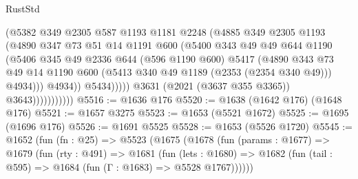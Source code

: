 \begin{lexlean}{RustStd}
\begin{coremodule}
{\begin{coremodule}
{{{{{{{{{{{{{{{{                                  (@5382
                                    @349
                                    @2305
                                    @587
                                    @1193
                                    @1181
                                    @2248
                                    (@4885
                                      @349
                                      @2305
                                      @1193
                                      (@4890
                                        @347
                                        @73
                                        @51
                                        @14
                                        @1191
                                        @600
                                        (@5400
                                          @343
                                          @49
                                          @49
                                          @644
                                          @1190
                                          (@5406
                                            @345
                                            @49
                                            @2336
                                            @644
                                            (@596 @1190 @600)
                                            @5417
                                            (@4890
                                              @343
                                              @73
                                              @49
                                              @14
                                              @1190
                                              @600
                                              (@5413 @340 @49 @1189 (@2353 (@2354 @340 @49)))
                                              @4934)))
                                        @4934))
                                    @5434)))))
                          @3631
                          (@2021 (@3637 @355 @3365))
                          @3643)))))))))))
@5516 := @1636 @176
@5520 := @1638 (@1642 @176) (@1648 @176)
@5521 := @1657 @3275
@5523 := @1653 (@5521 @1672)
@5525 := @1695 (@1696 @176)
@5526 := @1691 @5525
@5528 := @1653 (@5526 @1720)
@5545 := @1652
    (fun (fn : @25) =>
    @5523
      (@1675
        (@1678
          (fun (params : @1677) =>
          @1679
            (fun (rty : @491) =>
            @1681
              (fun (lets : @1680) =>
              @1682 (fun (tail : @595) => @1684 (fun (Γ : @1683) => @5528 @1767))))))
}}}}}}}}}}}}}}}}
\end{coremodule}}
\end{coremodule}
\end{lexlean}
